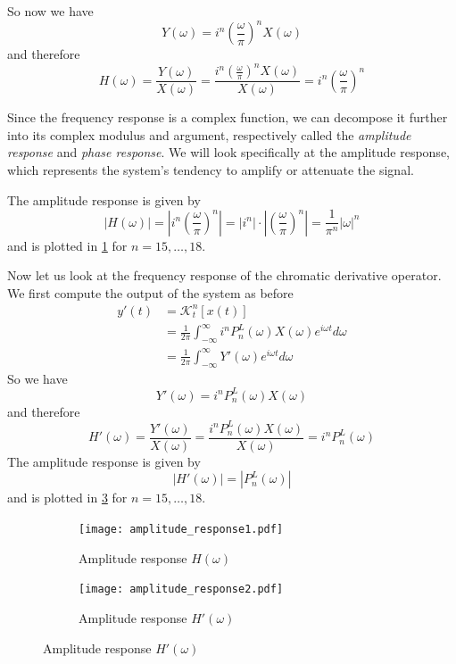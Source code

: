 \documentclass[11pt,oneside]{book}
\theoremstyle{plain}
\theoremstyle{definition}
\theoremstyle{remark}
\begin{document}
So now we have 
\begin{equation*}
  Y(\omega) = i^n \left(\frac{\omega}{\pi}\right)^n X(\omega)
\end{equation*}
and therefore
\begin{equation*}
  H(\omega) = \frac{Y(\omega)}{X(\omega)} = \frac{i^n \left(\frac{\omega}{\pi}\right)^n X(\omega)}{X(\omega)} = i^n \left(\frac{\omega}{\pi}\right)^n
\end{equation*}

Since the frequency response is a complex function, we can decompose it further 
into its complex modulus and argument, respectively called the \emph{amplitude response}
and \emph{phase response}. We will look specifically at the amplitude response, which 
represents the system's tendency to amplify or attenuate the signal.

The amplitude response is given by
\begin{equation*}
  |H(\omega)| = \left|i^n \left(\frac{\omega}{\pi}\right)^n\right| 
              = |i^n| \cdot \left|\left(\frac{\omega}{\pi}\right)^n\right| 
              = \frac{1}{\pi^n} |\omega|^n
\end{equation*}
and is plotted in \cref{fig:amp_response1} for $n=15, \dotsc, 18$.

Now let us look at the frequency response of the chromatic derivative operator. We first compute 
the output of the system as before
\begin{align*}
  y'(t) &= \mathcal{K}_t^n[x(t)] \\
        &= \frac{1}{2 \pi} \int_{-\infty}^{\infty} i^n P_n^L(\omega) X(\omega) e^{i\omega t} d\omega \\
        &= \frac{1}{2 \pi} \int_{-\infty}^{\infty} Y'(\omega) e^{i\omega t} d\omega
\end{align*}
So we have
\begin{equation*}
  Y'(\omega) = i^n P_n^L(\omega) X(\omega)
\end{equation*}
and therefore
\begin{equation*}
  H'(\omega) = \frac{Y'(\omega)}{X(\omega)} = \frac{i^n P_n^L(\omega) X(\omega)}{X(\omega)} = i^n P_n^L(\omega)
\end{equation*}
The amplitude response is given by
\begin{equation*}
  |H'(\omega)| = |P_n^L(\omega)|
\end{equation*}
and is plotted in \cref{fig:amp_response2} for $n=15, \dotsc, 18$.

\begin{figure}[H]
  \centering
  \caption{Amplitude responses of the differential (left) and chromatic derivative (right) operators for $n=15, \dotsc, 18$.}
  \begin{subfigure}[b]{0.49\textwidth}
    \texttt{[image: amplitude\_response1.pdf]}
    \caption{Amplitude response $H(\omega)$}
    \label{fig:amp_response1}
  \end{subfigure}
  \hfill
  \begin{subfigure}[b]{0.49\textwidth}
    \texttt{[image: amplitude\_response2.pdf]}
    \caption{Amplitude response $H'(\omega)$}
    \label{fig:amp_response2}
  \end{subfigure}
\end{figure}
\end{document}
